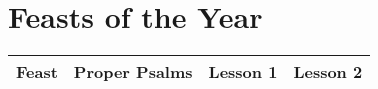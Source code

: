 \label{lectionary}
\section{Feasts of the Year}
\begin{longtable}{l c l l}
\multicolumn{1}{l}{Feast}&\multicolumn{1}{l}{Proper Psalms}&\multicolumn{1}{l}{Lesson 1}& \multicolumn{1}{l}{Lesson 2}\\
\hline
\endhead

%

%

%

%

%

%

%

\end{longtable}
